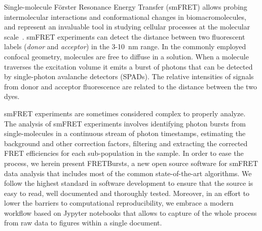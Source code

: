 Single-molecule Förster Resonance Energy Transfer (smFRET) allows probing intermolecular interactions
and conformational changes in biomacromolecules, and represent an 
invaluable tool in studying cellular processes at the molecular 
scale~\cite{Kapanidis_2006}. smFRET experiments can detect the distance between 
two fluorescent labels (\textit{donor} and \textit{acceptor}) in the 
3-10~nm range. In the commonly employed confocal geometry, molecules are free 
to diffuse in a solution. When a molecule traverses the excitation volume it 
emits a burst of photons that can be detected by single-photon avalanche detectors (SPADs). 
The relative intensities of signals from donor and acceptor fluorescence 
are related to the distance between the two dyes.

smFRET experiments are sometimes considered complex to properly analyze. 
The analysis of smFRET experiments involves identifying photon bursts from 
single-molecules in a continuous stream of photon timestamps, estimating the 
background and other correction factors, filtering and extracting the corrected 
FRET efficiencies for each sub-population in the sample. In order to ease 
the process, we herein present FRETBursts, a new open source software for smFRET data 
analysis that includes most of the common state-of-the-art algorithms. 
We follow the highest standard in software development to ensure that 
the source is easy to read, well documented and thoroughly tested. 
Moreover, in an effort to lower the barriers to computational reproducibility, 
we embrace a modern workflow based on Jypyter notebooks that allows to capture 
of the whole process from raw data to figures within a single document.
